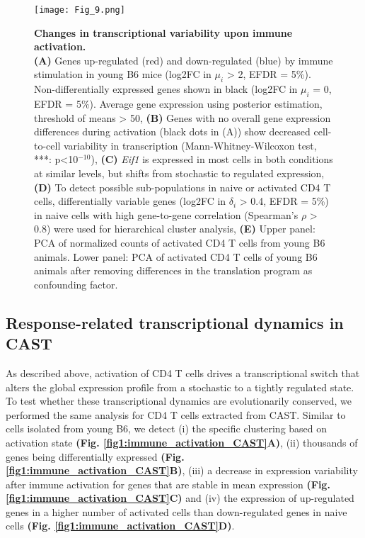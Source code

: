 \begin{figure}[!ht]
\centering
\texttt{[image: Fig\_9.png]}
\caption[Changes in transcriptional variability upon immune activation]{\textbf{Changes in transcriptional variability upon immune activation.}\\
\textbf{(A)} Genes up-regulated (red) and down-regulated (blue) by immune stimulation in young B6 mice (log2FC in $\mu_i$ > 2, EFDR = 5\%). Non-differentially expressed genes shown in black (log2FC in $\mu_i$ = 0, EFDR = 5\%). Average gene expression using posterior estimation, threshold of means > 50, \textbf{(B)} Genes with no overall gene expression differences during activation (black dots in (A)) show decreased cell-to-cell variability in transcription (Mann-Whitney-Wilcoxon test, ***: p<10$^{-10}$), \textbf{(C)} \textit{Eif1} is expressed in most cells in both conditions at similar levels, but shifts from stochastic to regulated expression, \textbf{(D)} To detect possible sub-populations in naive or activated CD4\plus{} T cells, differentially variable genes (log2FC in $\delta_i$ > 0.4, EFDR = 5\%) in naive cells with high gene-to-gene correlation (Spearman’s $\rho$ > 0.8) were used for hierarchical cluster analysis, \textbf{(E)} Upper panel: PCA of normalized counts of activated CD4\plus{} T cells from young B6 animals. Lower panel: PCA of activated CD4\plus{} T cells of young B6 animals after removing differences in the translation program as confounding factor.}
\label{fig1:immune_variability}
\end{figure}

\newpage


\subsection{Response-related transcriptional dynamics in CAST}

As described above, activation of CD4\plus{} T cells drives a transcriptional switch that alters the global expression profile from a stochastic to a tightly regulated state. To test whether these transcriptional dynamics are evolutionarily conserved, we performed the same analysis for CD4\plus{} T cells extracted from CAST. Similar to cells isolated from young B6, we detect (i) the specific clustering based on activation state \textbf{(Fig. \ref{fig1:immune_activation_CAST}A)}, (ii)  thousands of genes being differentially expressed \textbf{(Fig. \ref{fig1:immune_activation_CAST}B)}, (iii) a decrease in expression variability after immune activation for genes that are stable in mean expression \textbf{(Fig. \ref{fig1:immune_activation_CAST}C)} and (iv) the expression of up-regulated genes in a higher number of activated cells than down-regulated genes in naive cells \textbf{(Fig. \ref{fig1:immune_activation_CAST}D)}.

